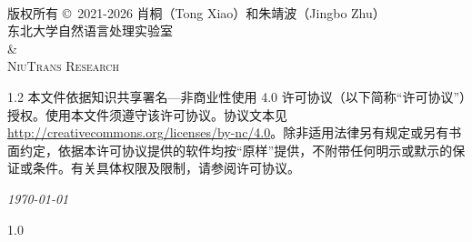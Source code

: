 \documentclass[UTF8,11pt,openany,fontset=windows]{ctexbook}
\let\cleardoublepage\clearpage
\begin{document}
\hypersetup{pageanchor=false}
\prefrontmatter

\hypersetup{pageanchor=true}
~\vfill

\noindent 版权所有 \copyright\ 2021-2026 肖桐（Tong Xiao）和朱靖波（Jingbo Zhu）\\

\noindent 东北大学自然语言处理实验室\\
\noindent \textsc{\&}\\
\noindent \textsc{NiuTrans Research}\\

\begin{spacing}{1.2}
\noindent 本文件依据知识共享署名—非商业性使用 4.0 许可协议（以下简称“许可协议”）授权。使用本文件须遵守该许可协议。协议文本见 \url{http://creativecommons.org/licenses/by-nc/4.0}。除非适用法律另有规定或另有书面约定，依据本许可协议提供的软件均按“原样”提供，不附带任何明示或默示的保证或条件。有关具体权限及限制，请参阅许可协议。
\end{spacing}

\noindent \textit{\today}


\cleardoublepage


\cleardoublepage

\renewcommand{\sectionmark}[1]{\markright{#1}}
\begin{spacing}{1.0}
\tableofcontents
\end{spacing}
\renewcommand{\sectionmark}[1]{\markright{\thesection\ #1}}

\mainmatter






\cleardoublepage

\renewcommand{\sectionmark}[1]{\markright{#1}}

\renewcommand{\bibsection}{\chapter*{\bibname}\addcontentsline{toc}{chapter}{\bibname}\markboth{\bibname}{\bibname}}

\pagestyle{fancy}
\fancyhf{}
\fancyhead[LE,RO]{\thepage}
\renewcommand{\headrulewidth}{0.4pt}


\cleardoublepage

\pagestyle{fancy}
\fancyhf{}
\fancyhead[LE,RO]{\thepage}
\renewcommand{\headrulewidth}{0.4pt}

\printindex %
\end{document}
